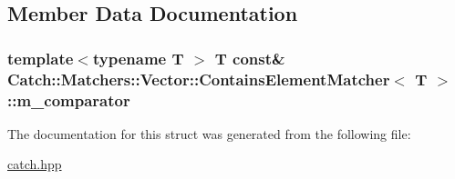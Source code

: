 \subsection{Member Data Documentation}
\hypertarget{struct_catch_1_1_matchers_1_1_vector_1_1_contains_element_matcher_ab7eada6c4bbce1d21b44773262f9cb23}{
\subsubsection[{m\-\_\-comparator}]{\setlength{\rightskip}{0pt plus 5cm}template$<$typename T $>$ T const\& {\bf Catch\-::\-Matchers\-::\-Vector\-::\-Contains\-Element\-Matcher}$<$ T $>$\-::m\-\_\-comparator}}\label{struct_catch_1_1_matchers_1_1_vector_1_1_contains_element_matcher_ab7eada6c4bbce1d21b44773262f9cb23}


The documentation for this struct was generated from the following file\-:\begin{DoxyCompactItemize}
\item 
\hyperlink{catch_8hpp}{catch.\-hpp}\end{DoxyCompactItemize}
